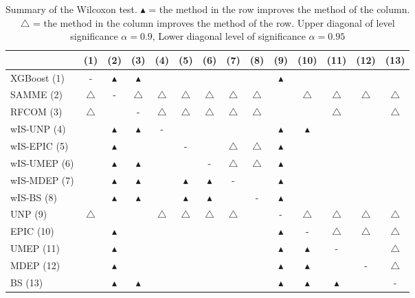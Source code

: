 \begin{table}[!ht]
\centering\scriptsize
\caption{Summary of the Wilcoxon test. $\blacktriangle$ = the method in the row improves the method of the column. $\triangle$ = the method in the column improves the method of the row. Upper diagonal of level significance $\alpha=0.9$, Lower diagonal level of significance $\alpha=0.95$}
\label{wIS-wilcoxon-table}
{\begin{tabular}{
|l|c|c|c|c|c|c|c|c|c|c|c|c|c|}
\hline
&(1) &(2) &(3) &(4) &(5) &(6) &(7) &(8) &(9) &(10) &(11) &(12) &(13) \\
\hline
XGBoost (1)& -& $\blacktriangle$ & $\blacktriangle$ &  &  &  &  &  & $\blacktriangle$ &  &  &  &  \\
\hline
SAMME (2)& $\triangle$ & -& $\triangle$ & $\triangle$ & $\triangle$ & $\triangle$ & $\triangle$ & $\triangle$ &  & $\triangle$ & $\triangle$ & $\triangle$ & $\triangle$ \\
\hline
RFCOM (3)& $\triangle$ &  & -& $\triangle$ & $\triangle$ & $\triangle$ & $\triangle$ & $\triangle$ &  &  & $\triangle$ &  & $\triangle$ \\
\hline
wIS-UNP (4)&  & $\blacktriangle$ & $\blacktriangle$ & -&  &  &  &  & $\blacktriangle$ & $\blacktriangle$ &  &  &  \\
\hline
wIS-EPIC (5)&  & $\blacktriangle$ &  &  & -&  & $\triangle$ & $\triangle$ & $\blacktriangle$ &  &  &  &  \\
\hline
wIS-UMEP (6)&  & $\blacktriangle$ & $\blacktriangle$ &  &  & -& $\triangle$ & $\triangle$ & $\blacktriangle$ &  &  &  &  \\
\hline
wIS-MDEP (7)&  & $\blacktriangle$ & $\blacktriangle$ &  & $\blacktriangle$ & $\blacktriangle$ & -&  & $\blacktriangle$ &  &  &  &  \\
\hline
wIS-BS (8)&  & $\blacktriangle$ & $\blacktriangle$ &  & $\blacktriangle$ & $\blacktriangle$ &  & -& $\blacktriangle$ &  &  &  &  \\
\hline
UNP (9)& $\triangle$ &  &  & $\triangle$ &$\triangle$ & $\triangle$ & $\triangle$ &  & -& $\triangle$ & $\triangle$ & $\triangle$ & $\triangle$ \\
\hline
EPIC (10)&  & $\blacktriangle$ &  &  &  &  &  &  & $\blacktriangle$ & -& $\triangle$ & $\triangle$ & $\triangle$ \\
\hline
UMEP (11)&  & $\blacktriangle$ &  &  &  &  &  &  & $\blacktriangle$ & $\blacktriangle$ & -&  & $\triangle$ \\
\hline
MDEP (12)&  & $\blacktriangle$ &  &  &  &  &  &  & $\blacktriangle$ & $\blacktriangle$ &  & -& $\triangle$ \\
\hline
BS (13)&  & $\blacktriangle$ & $\blacktriangle$ &  &  &  &  &  & $\blacktriangle$ & $\blacktriangle$ & $\blacktriangle$ &  & -\\
\hline
\end{tabular}}
\end{table}





